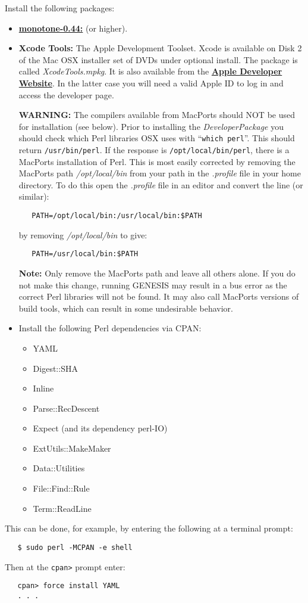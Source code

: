 \documentclass[12pt]{article}
\begin{document}
Install the following packages:
\begin{itemize}
   \item[]\href{http://monotone.ca/}{\bf monotone-0.44:} (or higher).
   \item[]{\bf Xcode Tools:} The Apple Development Toolset. Xcode is available on Disk 2 of the Mac OSX installer set of DVDs under optional install. The package is called {\it  XcodeTools.mpkg}. It is also available from the \href{http://developer.apple.com/technology/xcode.html}{\bf Apple Developer Website}. In the latter case  you will need a valid Apple ID to log in and access the developer page.
   
   {\bf WARNING:} The compilers available from MacPorts should NOT be used for installation (see below). Prior to installing the {\it DeveloperPackage} you should check which Perl libraries OSX uses with ``{\tt  which perl}''. This should return {\tt  /usr/bin/perl}. If the response is {\tt /opt/local/bin/perl}, there is a MacPorts installation of Perl. This is most easily corrected by removing the MacPorts path {\it /opt/local/bin} from your path in the {\it .profile} file in your home directory. To do this open the  {\it .profile} file in an editor and convert the line (or similar):
\begin{verbatim}
   PATH=/opt/local/bin:/usr/local/bin:$PATH
\end{verbatim}
by removing {\it /opt/local/bin} to give:
\begin{verbatim}
   PATH=/usr/local/bin:$PATH
\end{verbatim}
{\bf Note:} Only remove the MacPorts path and leave all others alone. If you do not make this change, running GENESIS may result in a bus error as the correct Perl libraries will not be found. It may also call MacPorts versions of build tools, which can result in some undesirable behavior.  

   
   \item[]Install the following Perl dependencies via CPAN:
      \begin{itemize}
         \item YAML
         \item Digest::SHA
         \item Inline
         \item Parse::RecDescent
         \item Expect (and its dependency perl-IO)
         \item ExtUtils::MakeMaker
         \item Data::Utilities
         \item File::Find::Rule
         \item Term::ReadLine
      \end{itemize}
   \end{itemize}
This can be done, for example, by entering the following at a terminal prompt:
\begin{verbatim}
   $ sudo perl -MCPAN -e shell
\end{verbatim}
Then at the {\tt cpan>} prompt enter:
\begin{verbatim}
   cpan> force install YAML
   . . . 
\end{verbatim}
   
\end{document}
